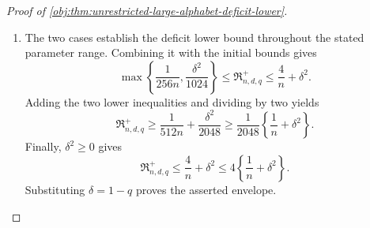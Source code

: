 \begin{proof}[Proof of \cref{obj:thm:unrestricted-large-alphabet-deficit-lower}]
\begin{enumerate}
Every constructed law belongs to the model class in
\cref{obj:def:unrestricted-arrival-model-class}. The independent fair treatment draw verifies
\cref{obj:ass:randomized-independence,obj:ass:balanced-randomization}, and the defining identities for the realized variables verify
\cref{obj:ass:surrogate-consistency,obj:ass:outcome-consistency}.
Within an occupied cell, the outcome under \(P_\xi\) is deterministic, while under \(P_\star\) its arrival draw is independent of the outcome; these properties verify
\cref{obj:ass:arrival-mar}. For every \(a\in\{0,1\}\) and \(x\in\{0,\ldots,d-1\}\), the cell probabilities of
\cref{obj:synth_16} are
\[
p_{ax0}(P_\xi)=p_{ax0}(P_\star)=\frac1{2d},
\qquad
p_{ax1}(P_\xi)=p_{ax1}(P_\star)=0.
\]
On the occupied cells, their arrival probabilities are
\[
\rho_{ax0}(P_\xi)=1-a\delta\xi_x\ge q,
\qquad
\rho_{ax0}(P_\star)
=
\begin{cases}
1,&a=0,\\
(1+q)/2,&a=1,
\end{cases}
\ge q.
\]
This verifies \cref{obj:ass:occupied-cell-arrival}, and hence
\[
P_\xi,P_\star\in\mathcal M^{+}_{n,d,q}.
\]

Each member-law risk is therefore at most
\(\mathcal R_{\mathrm{sup}}(\mathsf T)\). Since
\(\nu_{\mathrm{cell}}\) is a probability law,
\[
\mathcal R_{\mathrm{prior}}(\mathsf T)
\le
\int\mathcal R_{\mathrm{sup}}(\mathsf T)\,
\nu_{\mathrm{cell}}(d\xi)
=
\mathcal R_{\mathrm{sup}}(\mathsf T),
\qquad
\mathcal R_\star(\mathsf T)
\le\mathcal R_{\mathrm{sup}}(\mathsf T).
\]
It follows that
\[
2\mathcal R_{\mathrm{sup}}(\mathsf T)
\ge
\mathcal R_{\mathrm{prior}}(\mathsf T)+\mathcal R_\star(\mathsf T)
\ge\frac{h_{\mathrm{sep}}^2}{32}.
\]
Using \(h_{\mathrm{sep}}\ge\delta/4\ge0\), we conclude
\[
\mathcal R_{\mathrm{sup}}(\mathsf T)
\ge\frac{h_{\mathrm{sep}}^2}{64}
\ge\frac{\delta^2}{1024}.
\]
This holds for every kernel in the stated decision class. Taking its infimum, as in
\cref{obj:def:unrestricted-minimax-risk}, proves
\[
\frac{\delta^2}{1024}\le\mathfrak R^{+}_{n,d,q}
\]
in the remaining regime. %

\item The two cases establish the deficit lower bound throughout the stated parameter range. Combining it with the initial bounds gives
\[
\max\left\{\frac1{256n},\frac{\delta^2}{1024}\right\}
\le\mathfrak R^{+}_{n,d,q}
\le\frac4n+\delta^2.
\]
Adding the two lower inequalities and dividing by two yields
\[
\mathfrak R^{+}_{n,d,q}
\ge
\frac1{512n}+\frac{\delta^2}{2048}
\ge
\frac1{2048}\left\{\frac1n+\delta^2\right\}.
\]
Finally, \(\delta^2\ge0\) gives
\[
\mathfrak R^{+}_{n,d,q}
\le\frac4n+\delta^2
\le4\left\{\frac1n+\delta^2\right\}.
\]
Substituting \(\delta=1-q\) proves the asserted envelope. %
\end{enumerate}
\end{proof}

